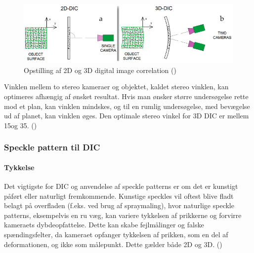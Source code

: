 \begin{figure}[H]
    \centering
    \includegraphics[width=0.9\linewidth]{Sections/2 Problemanalyse/Media/DIC 2D eller 3D.png}
    \caption{Opstilling af 2D og 3D digital image correlation (\cite{Wang2023FiberMonitoring})}
    \label{fig:2D og 3D DIC}
\end{figure}

Vinklen mellem to stereo kameraer og objektet, kaldet stereo vinklen, kan optimeres afhængig af ønsket resultat. Hvis man ønsker større undersøgelse rette mod et plan, kan vinklen mindskes, og til en rumlig undersøgelse, med bevægelse ud af planet, kan vinklen øges. Den optimale stereo vinkel for 3D DIC er mellem 15\degree og 35\degree. (\cite{Bigger2018ACorrelation})


\subsubsection{Speckle pattern til DIC} 
\paragraph{Tykkelse}Det vigtigste for DIC og anvendelse af speckle patterns er om det er kunstigt påført eller naturligt fremkommende. Kunstige speckles vil oftest blive fladt belagt på overfladen (f.eks. ved brug af spraymaling), hvor naturlige speckle patterns, eksempelvis en ru væg, kan variere tykkelsen af prikkerne og forvirre kameraets dybdeopfattelse. Dette kan skabe fejlmålinger og falske spændingsfelter, da kameraet opfanger tykkelsen af prikken, som en del af deformationen, og ikke som målepunkt. Dette gælder både 2D og 3D. (\cite{Byrne2020DigitalSoftware})



